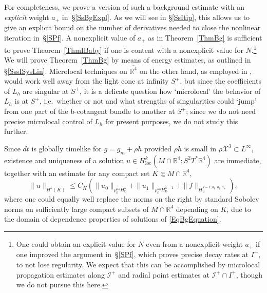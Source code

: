 \documentclass[reqno,11pt,letterpaper]{amsart}
\numberwithin{equation}{section}
\numberwithin{figure}{section}
\theoremstyle{definition}
\theoremstyle{remark}
\newcommand{\mc}{\mathcal}
\newcommand{\cX}{\mc X}
\newcommand{\ms}{\mathscr}
\newcommand{\scri}{\ms I}
\newcommand{\R}{\mathbb{R}}
\newcommand{\ol}{\overline}
\newcommand{\bop}{{\mathrm{b}}}
\newcommand{\loc}{{\mathrm{loc}}}
\newcommand{\Hloc}{H_{\loc}}
\newcommand{\Hb}{H_{\bop}}
\begin{document}
For completeness, we prove a version of such a background estimate with an \emph{explicit} weight $a_+$ in~\S\ref{SsBgExpl}. As we will see in \S\ref{SsItip}, this allows us to give an explicit bound on the number of derivatives needed to close the nonlinear iteration in~\S\ref{SPf}. A nonexplicit value of $a_+$ as in Theorem~\ref{ThmBg} is sufficient to prove Theorem~\ref{ThmIBaby} if one is content with a nonexplicit value for $N$.\footnote{One could obtain an explicit value for $N$ even from a nonexplicit weight $a_+$ if one improved the argument in~\S\ref{SPf}, which proves precise decay rates at $I^+$, to not lose regularity. We expect that this can be accomplished by microlocal propagation estimates along $\scri^+$ and radial point estimates at $\scri^+\cap I^+$, though we do not pursue this here.} We will prove Theorem~\ref{ThmBg} by means of energy estimates, as outlined in \S\ref{SssISysLin}. Microlocal techniques on $\ol{\R^4}$ on the other hand, as employed in \cite{BaskinVasyWunschRadMink}, would work well away from the light cone at infinity $S^+$, but since the coefficients of $L_h$ are singular at $S^+$, it is a delicate question how `microlocal' the behavior of $L_h$ is at $S^+$, i.e.\ whether or not and what strengths of singularities could `jump' from one part of the b-cotangent bundle to another at $S^+$; since we do not need precise microlocal control of $L_h$ for present purposes, we do not study this further.

Since $d t$ is globally timelike for $g=g_m+\rho h$ provided $\rho h$ is small in $\rho\cX^3\subset L^\infty$, existence and uniqueness of a solution $u\in\Hloc^k(M\cap\R^4;S^2 T^*\R^4)$ are immediate, together with an estimate for any compact set $K\Subset M\cap\R^4$,
\begin{equation}
\label{EqBgCompact}
  \| u \|_{H^k(K)} \leq C_K ( \| u_0 \|_{\rho_0^{a_0}\Hb^k} + \| u_1 \|_{\rho_0^{a_0}\Hb^{k-1}} + \| f \|_{\Hb^{k-1;a_0,a_I,a_+}} ),
\end{equation}
where one could equally well replace the norms on the right by standard Sobolev norms on sufficiently large compact subsets of $M\cap\R^4$ depending on $K$, due to the domain of dependence properties of solutions of \eqref{EqBgEquation}.
\end{document}
